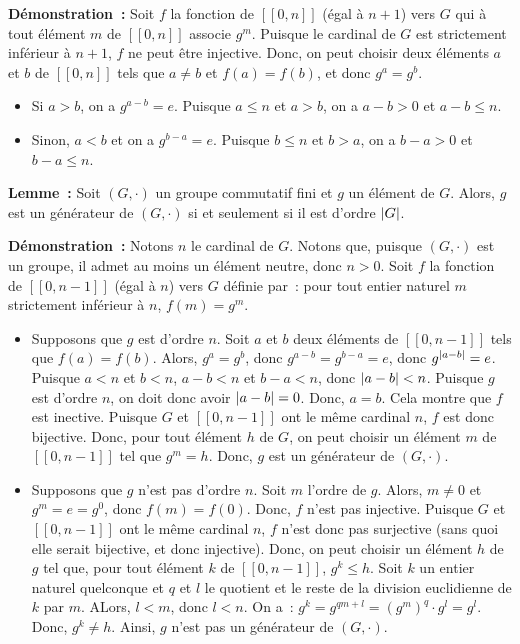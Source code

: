 \medskip

\noindent\textbf{Démonstration :} Soit $f$ la fonction de $[\![0, n]\!]$ (égal à $n+1$) vers $G$ qui à tout élément $m$ de $[\![0, n]\!]$ associe $g^m$. 
    Puisque le cardinal de $G$ est strictement inférieur à $n+1$, $f$ ne peut être injective.
    Donc, on peut choisir deux éléments $a$ et $b$ de $[\![0,n]\!]$ tels que $a \neq b$ et $f(a) = f(b)$, et donc $g^a = g^b$. 
    \begin{itemize}[nosep]
        \item Si $a > b$, on a $g^{a-b} = e$.
            Puisque $a \leq n$ et $a > b$, on a $a-b > 0$ et $a-b \leq n$. 
        \item Sinon, $a < b$ et on a $g^{b-a} = e$.
            Puisque $b \leq n$ et $b > a$, on a $b-a > 0$ et $b-a \leq n$. 
    \end{itemize}

    \done

\medskip

\noindent\textbf{Lemme :} Soit $(G, \cdot)$ un groupe commutatif fini et $g$ un élément de $G$. 
    Alors, $g$ est un générateur de $(G, \cdot)$ si et seulement si il est d'ordre $\left\lvert G \right\rvert$. 

\medskip

\noindent\textbf{Démonstration :} 
Notons $n$ le cardinal de $G$.
Notons que, puisque $(G,\cdot)$ est un groupe, il admet au moins un élément neutre, donc $n > 0$.
Soit $f$ la fonction de $[\![0, n-1]\!]$ (égal à $n$) vers $G$ définie par : pour tout entier naturel $m$ strictement inférieur à $n$, $f(m) = g^m$.
\begin{itemize}[nosep]
    \item Supposons que $g$ est d'ordre $n$.
        Soit $a$ et $b$ deux éléments de $[\![0, n-1]\!]$ tels que $f(a) = f(b)$.
        Alors, $g^a = g^b$, donc $g^{a-b} = g^{b-a} = e$, donc $g^{\left\lvert a-b \right\rvert} = e$.
        Puisque $a < n$ et $b < n$, $a-b < n$ et $b-a < n$, donc $\left\lvert a-b \right\rvert < n$.
        Puisque $g$ est d'ordre $n$, on doit donc avoir $\left\lvert a-b \right\rvert = 0$.
        Donc, $a = b$.
        Cela montre que $f$ est inective.
        Puisque $G$ et $[\![0, n-1]\!]$ ont le même cardinal $n$, $f$ est donc bijective.
        Donc, pour tout élément $h$ de $G$, on peut choisir un élément $m$ de $[\![0, n-1]\!]$ tel que $g^m = h$.
        Donc, $g$ est un générateur de $(G,\cdot)$.
    \item Supposons que $g$ n'est pas d'ordre $n$. 
        Soit $m$ l'ordre de $g$.
        Alors, $m \neq 0$ et $g^m = e = g^0$, donc $f(m) = f(0)$.
        Donc, $f$ n'est pas injective.
        Puisque $G$ et $[\![0, n-1]\!]$ ont le même cardinal $n$, $f$ n'est donc pas surjective (sans quoi elle serait bijective, et donc injective).
        Donc, on peut choisir un élément $h$ de $g$ tel que, pour tout élément $k$ de $[\![0, n-1]\!]$, $g^k \leq h$.
        Soit $k$ un entier naturel quelconque et $q$ et $l$ le quotient et le reste de la division euclidienne de $k$ par $m$. 
        ALors, $l < m$, donc $l < n$.
        On a : $g^k = g^{q m + l} = (g^m)^q \cdot g^l = g^l$.
        Donc, $g^k \neq h$.
        Ainsi, $g$ n'est pas un générateur de $(G,\cdot)$.
\end{itemize}

